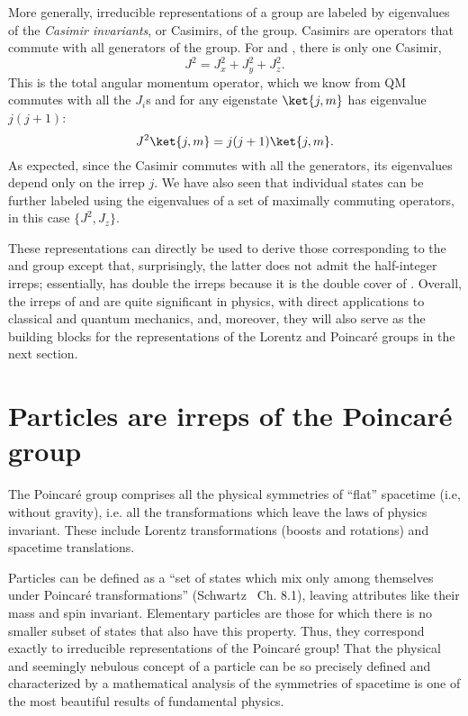 \begin{definition}
\label{def:01_casimir}
More generally, irreducible representations of a group are labeled by eigenvalues of the \textit{Casimir invariants}, or Casimirs, of the group.
Casimirs are operators that commute with all generators of the group.
For \so[3] and \su[2], there is only one Casimir,
\begin{equation}
\label{eq:01_so3_su2_casimir}
J^2 = J_x^2 + J_y^2 + J_z^2.
\end{equation}
This is the total angular momentum operator, which we know from QM commutes with all the $J_i$s and for any eigenstate $\ket{j, m}$ has eigenvalue $j(j+1)$:
\begin{equation}
\label{eq:01_so3_su2_casimir_eigenvalue}
J^2\ket{j, m} = j(j+1)\ket{j, m}.
\end{equation}
As expected, since the Casimir commutes with all the generators, its eigenvalues depend only on the irrep $j$.
We have also seen that individual states can be further labeled using the eigenvalues of a set of maximally commuting operators, in this case $\{J^2, J_z\}$.
\end{definition}

These representations can directly be used to derive those corresponding to the \SU[2] and \SO[3] group except that, surprisingly, the latter does not admit the half-integer irreps; essentially, \SU[2] has double the irreps because it is the double cover of \SO[3].
Overall, the irreps of \su[2] and \su[3] are quite significant in physics, with direct applications to classical and quantum mechanics, and, moreover, they will also serve as the building blocks for the representations of the Lorentz and Poincaré groups in the next section.

\section{Particles are irreps of the Poincaré group}
\label{sec:01_symmetries_poincare}

The Poincaré group comprises all the physical symmetries of ``flat'' spacetime (i.e, without gravity), i.e. all the transformations which leave the laws of physics invariant.
These include Lorentz transformations (boosts and rotations) and spacetime translations.

Particles can be defined as a ``set of states which mix only among themselves under Poincaré transformations'' (Schwartz~\cite{Schwartz:2014sze} Ch. 8.1), leaving attributes like their mass and spin invariant.
Elementary particles are those for which there is no smaller subset of states that also have this property.
Thus, they correspond exactly to irreducible representations of the Poincaré group!
That the physical and seemingly nebulous concept of a particle can be so precisely defined and characterized by a mathematical analysis of the symmetries of spacetime is one of the most beautiful results of fundamental physics.


